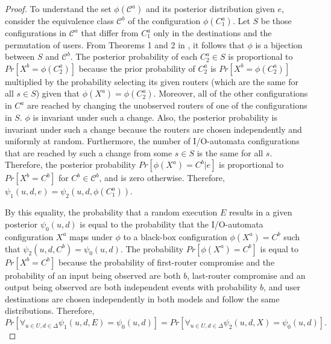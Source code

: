 \documentclass[prodmode,acmtissec]{acmsmall}
\begin{document}
\begin{proof}
To understand the set $\phi(\mathcal{C}^a)$ and its posterior distribution given $e$, consider the equivalence class $\mathcal{C}^b$ of the configuration $\phi(C_1^a)$.  Let $S$ be those configurations in $\mathcal{C}^a$ that differ from $C_1^a$ only in the destinations and the permutation of users.   From Theorems 1 and 2 in , it follows that $\phi$ is a bijection between $S$ and $\mathcal{C}^b$.  The posterior probability of each $C_2^a\in S$ is proportional to $Pr[X^b = \phi(C_2^a)]$ because the prior probability of $C_2^a$ is $Pr[X^b = \phi(C_2^a)]$ multiplied by the probability selecting its given routers (which are the same for all $s\in S$) given that $\phi(X^a)=\phi(C_2^a)$.  Moreover, all of the other configurations in $C^a$ are reached by changing the unobserved routers of one of the configurations in $S$.  $\phi$ is invariant under such a change.  Also, the posterior probability is invariant under such a change because the routers are chosen independently and uniformly at random.  Furthermore, the number of I/O-automata configurations that are reached by such a change from some $s\in S$ is the same for all $s$.  Therefore, the posterior probability $Pr[\phi(X^a)=C^b | e]$ is proportional to $Pr[X^b=C^b]$ for $C^b\in \mathcal{C}^b$, and is zero otherwise.  Therefore, $\psi_1(u,d,e) = \psi_2(u,d,\phi(C_1^a))$.

By this equality, the probability that a random execution $E$ results in a given posterior $\psi_0(u,d)$ is equal to the probability that the I/O-automata configuration $X^a$ maps under $\phi$ to a black-box configuration $\phi(X^a) = C^b$ such that $\psi_2(u,d,C^b)=\psi_0(u,d)$.  The probability $Pr[\phi(X^a) = C^b]$ is equal to $Pr[X^b = C^b]$ because the probability of first-router compromise and the probability of an input being observed are both $b$, last-router compromise and an output being observed are both independent events with probability $b$, and user destinations are chosen independently in both models and follow the same distributions.  Therefore,
\begin{equation*}
Pr[\forall_{u\in U, d\in \Delta} \psi_1(u,d,E) = \psi_0(u,d)] = Pr[\forall_{u\in U, d\in \Delta} \psi_2(u,d,X) = \psi_0(u,d)].
\end{equation*}
\end{proof}
\end{document}
